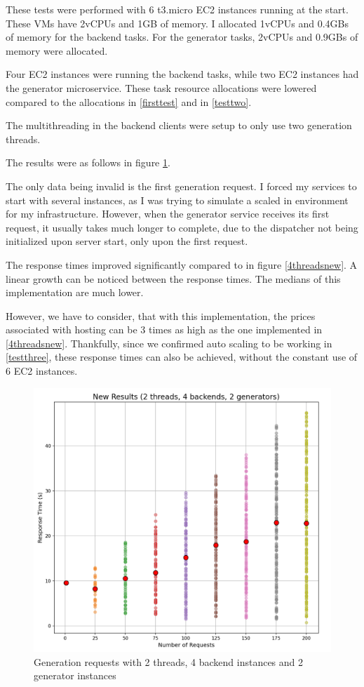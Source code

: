 				These tests were performed with 6 t3.micro EC2 instances running at the start. 
				These VMs have 2vCPUs and 1GB of memory. I allocated
				1vCPUs and 0.4GBs of memory for the backend tasks. 
				For the generator tasks, 2vCPUs and 0.9GBs of memory were allocated.

				Four EC2 instances were running the backend tasks, while two EC2 instances had the generator microservice.
				These task resource allocations were lowered compared to the allocations in \ref{firsttest} and in \ref{testtwo}.

				The multithreading in the backend clients were setup to only use two generation threads.

				The results were as follows in figure \ref{2threads4web2gen}.

				The only data being invalid is the first generation request. I forced my services to start with several instances, as I was trying to 
				simulate a scaled in environment for my infrastructure. However, when the generator service receives its first request, it usually takes
				much longer to complete, due to the dispatcher not being initialized upon server start, only upon the first request.

				The response times improved significantly compared to in figure \ref{4threadsnew}. A linear growth can be noticed between the response times.
				The medians of this implementation are much lower. 
				
				However, we have to consider, that with this implementation, the prices associated with hosting
				can be 3 times as high as the one implemented in \ref{4threadsnew}. Thankfully, since we confirmed auto scaling to be working in \ref{testthree},
				these response times can also be achieved, without the constant use of 6 EC2 instances.

				\begin{figure}[h]
					\begin{center}
						\includegraphics[scale=0.6]{include/imgs/2t_4w_2g_new.PNG}
						\caption{Generation requests with 2 threads, 4 backend instances and 2 generator instances}
						\label{2threads4web2gen}
					\end{center}
				\end{figure}

			

